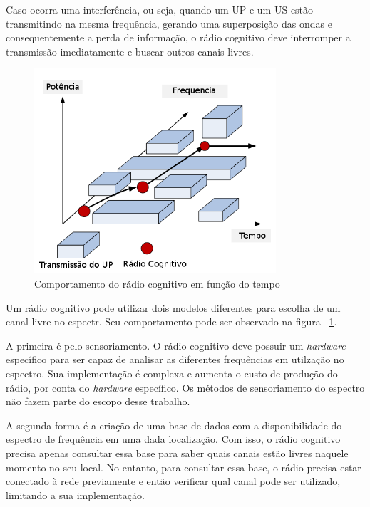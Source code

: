 Caso ocorra uma interferência, ou seja, quando um UP e um US estão transmitindo na mesma frequência, gerando uma superposição das ondas e consequentemente a perda de informação, o rádio cognitivo deve interromper a transmissão imediatamente e buscar outros canais livres.

\begin{figure}[htb]
\centering
\includegraphics[width=0.8\textwidth]{figs/cr_functioning_over_time}
\caption[Comportamento do rádio cognitivo em função do tempo]
{Comportamento do rádio cognitivo em função do tempo}
\label{fig:funcionamentodoradiocognitivo}
\end{figure} 

Um rádio cognitivo pode utilizar dois modelos diferentes para escolha de um canal livre no espectr. Seu comportamento pode ser observado na figura ~\ref{fig:funcionamentodoradiocognitivo}.

A primeira é pelo sensoriamento. O rádio cognitivo deve possuir um \textit{hardware} específico para ser capaz de analisar as diferentes frequências em utilzação no espectro. Sua implementação é complexa e aumenta o custo de produção do rádio, por conta do \textit{hardware} específico. Os métodos de sensoriamento do espectro não fazem parte do escopo desse trabalho.

A segunda forma é a criação de uma base de dados com a disponibilidade do espectro de frequência em uma dada localização. Com isso, o rádio cognitivo precisa apenas consultar essa base para saber quais canais estão livres naquele momento no seu local. No entanto, para consultar essa base, o rádio precisa estar conectado à rede previamente e então verificar qual canal pode ser utilizado, limitando a sua implementação.

